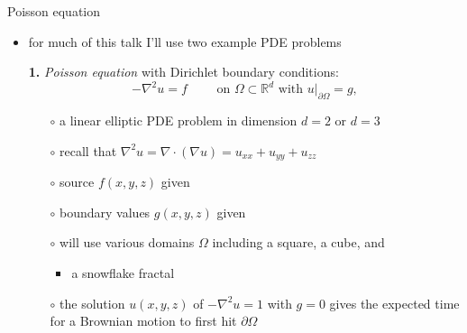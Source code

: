 \documentclass[hide notes,intlimits,usenames,dvipsnames]{beamer}
\newcommand{\RR}{\mathbb{R}}
\newcommand{\Div}{\nabla\cdot}
\newcommand{\grad}{\nabla}
\begin{document}
\begin{frame}{Poisson equation}

\begin{itemize}
\item for much of this talk I'll use two example PDE problems

\bigskip
\item[\textbf{1.}] \emph{Poisson equation} with Dirichlet boundary conditions:
	    $$- \grad^2 u = f \qquad \text{ on } \Omega \subset \RR^d \text{ with } u\big|_{\partial \Omega} = g,$$
    \vspace{-5mm}
	\begin{itemize}
	\item[$\circ$] a linear elliptic PDE problem in dimension $d=2$ or $d=3$
	\item[$\circ$] recall that $\grad^2 u = \Div \left(\grad u\right) = u_{xx}+u_{yy}+u_{zz}$
	\item[$\circ$] source $f(x,y,z)$ given
	\item[$\circ$] boundary values $g(x,y,z)$ given
	\item[$\circ$] will use various domains $\Omega$ including a square, a cube, and
		\begin{itemize}
        \item a snowflake fractal \hspace{0.3in} \begin{tikzpicture}[scale=0.8,baseline]  \end{tikzpicture}
        \end{itemize}
	\item[$\circ$] the solution $u(x,y,z)$ of $- \grad^2 u = 1$ with $g=0$ gives the expected time for a Brownian motion to first hit $\partial\Omega$
	\end{itemize}
\end{itemize}
\end{frame}
\end{document}
